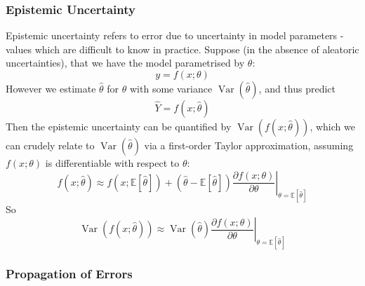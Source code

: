 \documentclass[11pt]{report} %
\begin{document}
\subsubsection{Epistemic Uncertainty}

Epistemic uncertainty refers to error due to uncertainty in model parameters - values which are difficult to know in practice. Suppose (in the absence of aleatoric uncertainties), that we have the model parametrised by $\theta$:
\begin{equation}
y = f\left(x;\theta\right)
\end{equation}
However we estimate $\widehat{\theta}$ for $\theta$ with some variance $\operatorname{Var}\left(\widehat{\theta}\right)$, and thus predict
\begin{equation}
\widehat{Y} = f\left(x;\widehat{\theta}\right)
\end{equation}
Then the epistemic uncertainty can be quantified by $\operatorname{Var}\left(f\left(x;\widehat{\theta}\right)\right)$, which we can crudely relate to $\operatorname{Var}\left(\widehat{\theta}\right)$ via a first-order Taylor approximation, assuming $f\left(x; \theta\right)$ is differentiable with respect to $\theta$:
\begin{equation}
f\left(x;\widehat{\theta}\right) \approx f\left(x;\mathbb{E}\left[\widehat{\theta}\right]\right) + \left(\widehat{\theta} - \mathbb{E}\left[\widehat{\theta}\right]\right)\left.\dfrac{\partial f\left(x;\theta\right)}{\partial\theta}\right|_{\theta = \mathbb{E}\left[\widehat{\theta}\right]}
\end{equation}
So
\begin{equation}
\operatorname{Var}\left(f\left(x;\widehat{\theta}\right)\right) \approx \operatorname{Var}\left(\widehat{\theta}\right)\left.\dfrac{\partial f\left(x;\theta\right)}{\partial\theta}\right|_{\theta = \mathbb{E}\left[\widehat{\theta}\right]}
\end{equation}

\subsubsection{Propagation of Errors}
\end{document}
